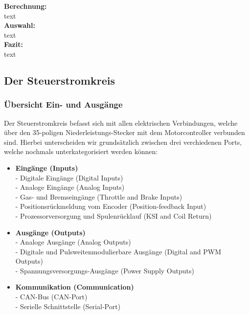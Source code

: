 \textbf{Berechnung:} 
\\[2mm]
text
\\[5mm]

\textbf{Auswahl:}
\\[2mm]
text
\\[5mm]

\textbf{Fazit:}
\\[2mm]
text

\newpage



\subsection{Der Steuerstromkreis}
\subsubsection{Übersicht Ein- und Ausgänge}
Der Steuerstromkreis befasst sich mit allen elektrischen Verbindungen, welche über den  35-poligen Niederleistungs-Stecker mit dem Motorcontroller verbunden sind. Hierbei unterscheiden wir grundsätzlich zwischen drei verchiedenen Ports, welche nochmals unterkategorisiert werden können:

\vspace{3mm}

\begin{itemize}
	\item \textbf{Eingänge (Inputs)}
	\\ - Digitale Eingänge (Digital Inputs)
	\\ - Analoge Eingänge (Analog Inputs)
	\\ - Gas- und Bremseingänge (Throttle and Brake Inputs)
	\\ - Positionsrückmeldung vom Encoder (Position-feedback Input)
	\\ - Prozessorversorgung und Spulenrücklauf (KSI and Coil Return)
	\item \textbf{Ausgänge (Outputs)}
	\\ - Analoge Ausgänge (Analog Outputs)
	\\ - Digitale und Pulsweitenmodulierbare Ausgänge (Digital and PWM Outputs)
	\\ - Spannungsversorgungs-Ausgänge (Power Supply Outputs)
	\item \textbf{Kommunikation (Communication)}
	\\ -  CAN-Bus (CAN-Port)
	\\ -  Serielle Schnittstelle (Serial-Port)
\end{itemize}

